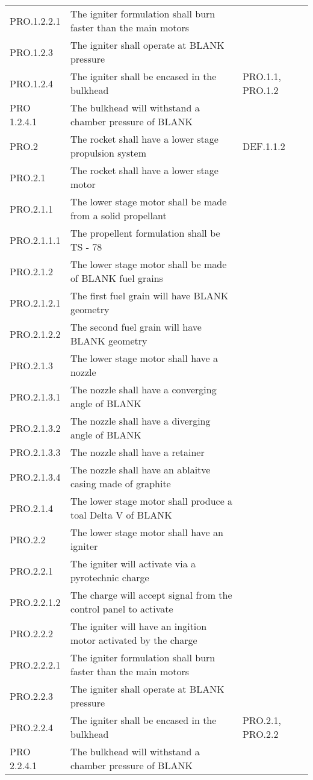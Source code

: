 \begin{table}[htbp]
\begin{tabulary}{\textwidth}{@{}LLL@{}}
        PRO.1.2.2.1 & The igniter formulation shall burn faster than the main motors & \\
        PRO.1.2.3 & The igniter shall operate at BLANK pressure & \\
        PRO.1.2.4 & The igniter shall be encased in the bulkhead & PRO.1.1, PRO.1.2 \\
        PRO 1.2.4.1 & The bulkhead will withstand a chamber pressure of BLANK & \\
    \midrule
        PRO.2 & The rocket shall have a lower stage propulsion system & DEF.1.1.2 \\
        PRO.2.1 & The rocket shall have a lower stage motor & \\
        PRO.2.1.1 & The lower stage motor shall be made from a solid propellant & \\
        PRO.2.1.1.1 & The propellent formulation shall be TS - 78 & \\
        PRO.2.1.2 & The lower stage motor shall be made of BLANK fuel grains & \\
        PRO.2.1.2.1 & The first fuel grain will have BLANK geometry & \\
        PRO.2.1.2.2 & The second fuel grain will have BLANK geometry & \\
        PRO.2.1.3 & The lower stage motor shall have a nozzle & \\
        PRO.2.1.3.1 & The nozzle shall have a converging angle of BLANK & \\
        PRO.2.1.3.2 & The nozzle shall have a diverging angle of BLANK & \\
        PRO.2.1.3.3 & The nozzle shall have a retainer & \\
        PRO.2.1.3.4 & The nozzle shall have an ablaitve casing made of graphite & \\
        PRO.2.1.4 & The lower stage motor shall produce a toal Delta V of BLANK & \\
    \midrule
        PRO.2.2 & The lower stage motor shall have an igniter & \\
        PRO.2.2.1 & The igniter will activate via a pyrotechnic charge & \\
        PRO.2.2.1.2 & The charge will accept signal from the control panel to activate & \\
        PRO.2.2.2 & The igniter will have an ingition motor activated by the charge & \\
        PRO.2.2.2.1 & The igniter formulation shall burn faster than the main motors & \\
        PRO.2.2.3 & The igniter shall operate at BLANK pressure & \\
        PRO.2.2.4 & The igniter shall be encased in the bulkhead & PRO.2.1, PRO.2.2 \\
        PRO 2.2.4.1 & The bulkhead will withstand a chamber pressure of BLANK & \\        
    \bottomrule
    \end{tabulary}

    \label{table:all-prop-req}
\end{table}


